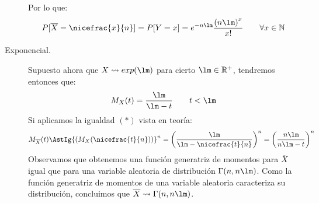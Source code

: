 \begin{ejercicio}
\begin{description}
\begin{equation*}
            \end{equation*}
            Por lo que:
            \begin{equation*}
                P[\overline{X}=\nicefrac{x}{n}] = P[Y=x] = e^{-n\lm} \dfrac{{(n\lm)}^{x}}{x!} \qquad \forall x\in \mathbb{N}
            \end{equation*}
        \item [Exponencial.] Supuesto ahora que $X\rightsquigarrow exp(\lm)$ para cierto $\lm\in \mathbb{R}^+$, tendremos entonces que:
            \begin{equation*}
                M_X(t) = \dfrac{\lm}{\lm - t} \qquad t<\lm
            \end{equation*}
            Si aplicamos la igualdad $(\ast)$ vista en teoría:
            \begin{align*}
                M_{\overline{X}}(t) &\AstIg {(M_X(\nicefrac{t}{n}))}^{n} = {\left(\dfrac{\lm}{\lm - \nicefrac{t}{n}}\right)}^{n} = {\left(\dfrac{n\lm}{n\lm - t}\right)}^{n}
            \end{align*}
            Observamos que obtenemos una función generatriz de momentos para $\overline{X}$ igual que para una variable aleatoria de distribución $\Gamma(n,n\lm)$. Como la función generatriz de momentos de una variable aleatoria caracteriza su distribución, concluimos que $\overline{X}\rightsquigarrow\Gamma(n,n\lm)$.
    \end{description}
\end{ejercicio}

